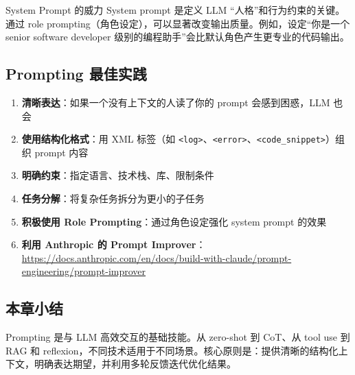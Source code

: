 \begin{knowledgebox}{System Prompt 的威力}
System prompt 是定义 LLM ``人格''和行为约束的关键。通过 role prompting（角色设定），可以显著改变输出质量。例如，设定``你是一个 senior software developer 级别的编程助手''会比默认角色产生更专业的代码输出。
\end{knowledgebox}

\subsection{Prompting 最佳实践}

\begin{enumerate}
    \item \textbf{清晰表达}：如果一个没有上下文的人读了你的 prompt 会感到困惑，LLM 也会
    \item \textbf{使用结构化格式}：用 XML 标签（如 \texttt{<log>}、\texttt{<error>}、\texttt{<code\_snippet>}）组织 prompt 内容
    \item \textbf{明确约束}：指定语言、技术栈、库、限制条件
    \item \textbf{任务分解}：将复杂任务拆分为更小的子任务
    \item \textbf{积极使用 Role Prompting}：通过角色设定强化 system prompt 的效果
    \item \textbf{利用 Anthropic 的 Prompt Improver}：\url{https://docs.anthropic.com/en/docs/build-with-claude/prompt-engineering/prompt-improver}
\end{enumerate}

\subsection{本章小结}

Prompting 是与 LLM 高效交互的基础技能。从 zero-shot 到 CoT、从 tool use 到 RAG 和 reflexion，不同技术适用于不同场景。核心原则是：提供清晰的结构化上下文，明确表达期望，并利用多轮反馈迭代优化结果。

